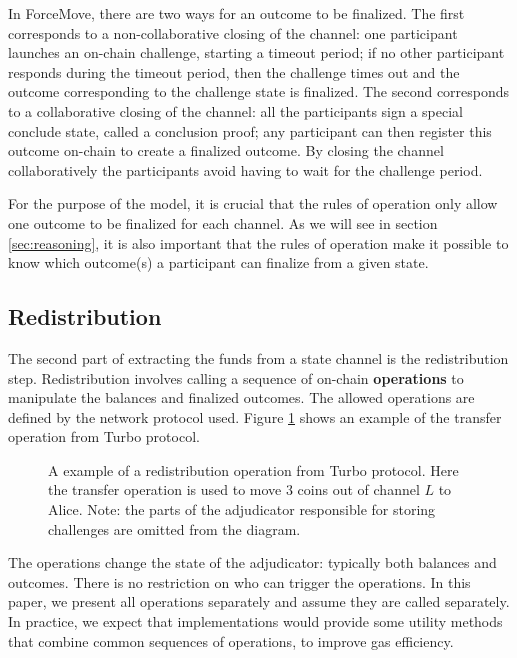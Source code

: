 In ForceMove, there are two ways for an outcome to be finalized.
The first corresponds to a non-collaborative closing of the channel:
one participant launches an on-chain challenge, starting a timeout period;
if no other participant responds during the timeout period, then the challenge times out and the outcome
corresponding to the challenge state is finalized.
The second corresponds to a collaborative closing of the channel:
all the participants sign a special conclude state, called a conclusion proof; 
any participant can then register this outcome on-chain to create a finalized outcome.
By closing the channel collaboratively the participants avoid having to wait for the challenge period.

For the purpose of the model, it is crucial that the rules of operation only allow one outcome to be finalized for each channel.
As we will see in section \ref{sec:reasoning}, it is also important that the rules of operation make it possible to know which outcome(s) a participant can finalize from a given state.

\subsection{Redistribution}\label{sec:redistribution}

The second part of extracting the funds from a state channel is the redistribution step.
Redistribution involves calling a sequence of on-chain \textbf{operations} to manipulate
the balances and finalized outcomes.
The allowed operations are defined by the network protocol used.
Figure \ref{fig:redistribution} shows an example of the transfer operation from Turbo protocol.

\begin{figure}[h]\centering
  \makebox[\textwidth][c]{}
  \caption{
    A example of a redistribution operation from Turbo protocol.
    Here the transfer operation is used to move $3$ coins out of channel $L$ to Alice.
    Note: the parts of the adjudicator responsible for storing challenges are omitted from the diagram.
  }\label{fig:redistribution}
\end{figure}

The operations change the state of the adjudicator: typically both balances and outcomes.
There is no restriction on who can trigger the operations.
In this paper, we present all operations separately and assume they are called separately.
In practice, we expect that implementations would provide some utility methods that combine
common sequences of operations, to improve gas efficiency.

